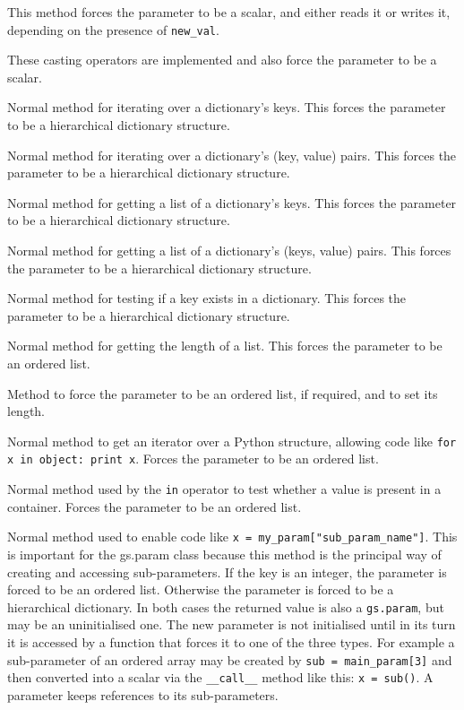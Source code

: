 \documentclass[12pt,oneside]{gsbook}
\begin{document}
\begin{methods}

 {This method forces the parameter to be
a scalar, and either reads it or writes it, depending on the presence of
\texttt{new\_val}.}

 {
These casting operators are implemented and also force the parameter to be
a scalar.}

 {Normal method for iterating over a dictionary's keys.  This
forces the parameter to be a hierarchical dictionary structure.}

 {Normal method for iterating over a dictionary's (key, value)
pairs.  This forces the parameter to be a hierarchical dictionary structure.}

 {Normal method for getting a list of a dictionary's keys.  This
forces the parameter to be a hierarchical dictionary structure.}

 {Normal method for getting a list of a dictionary's (keys, value)
pairs.  This
forces the parameter to be a hierarchical dictionary structure.}

 {Normal method for testing if a key exists in a dictionary.  This
forces the parameter to be a hierarchical dictionary structure.}

 {Normal method for getting the length of a list.  This
forces the parameter to be an ordered list.}

 {Method to force the parameter to be an ordered list,
if required, and to set its length.}

 {Normal method to get an iterator over a Python structure,
allowing code like \texttt{for x in object:  print x}.  Forces the parameter to
be an ordered list.}

 {Normal method used by the \texttt{in} operator
to test whether a value is present in a container.  Forces the parameter to be
an ordered list.}

 {Normal method used to enable code like
\texttt{x = my\_param["sub\_param\_name"]}.  This is important for the gs.param
class because this method is the principal way of creating and accessing
sub-parameters.  If the key is an integer, the parameter is forced to be an
ordered list.  Otherwise the parameter is forced to be a hierarchical dictionary.
In both cases the returned value is also a \texttt{gs.param}, but may be an
uninitialised one.  The new parameter is not initialised until in its turn it is
accessed by a function that forces it to one of the three types.  For example a
sub-parameter of an ordered array may be created by \texttt{sub = main\_param[3]}
and then converted into a scalar via the \texttt{\_\_call\_\_} method like
this: \texttt{x = sub()}.  A parameter keeps references to its sub-parameters.}


\end{methods}
\end{document}
